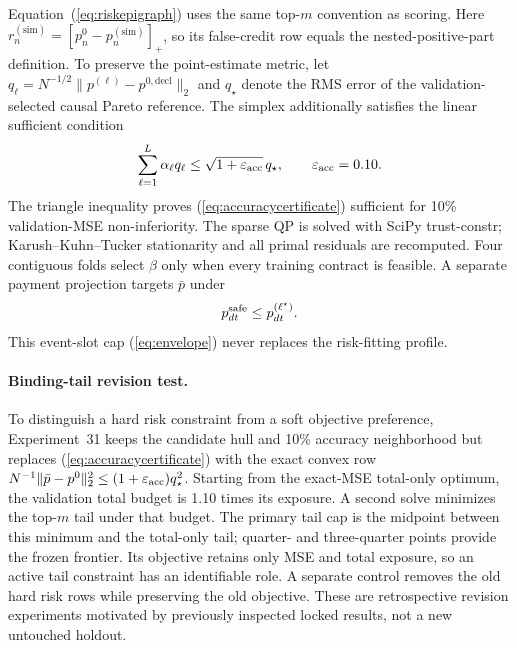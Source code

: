 \documentclass[10pt,journal]{IEEEtran}
\begin{document}
Equation~(\ref{eq:riskepigraph}) uses the same top-$m$ convention as scoring.
Here $r^{(\mathrm{sim})}_n=[p^0_n-p^{(\mathrm{sim})}_n]_+$, so its false-credit
row equals the nested-positive-part definition. To preserve the point-estimate metric, let
$q_\ell=N^{-1/2}\|p^{(\ell)}-p^{0,\mathrm{decl}}\|_2$ and
$q_\star$ denote the RMS error of the validation-selected causal Pareto
reference. The simplex additionally satisfies the linear sufficient condition
\begin{equation}
 \sum_{\ell=1}^{L}\alpha_\ell q_\ell
 \leq \sqrt{1+\varepsilon_{\rm acc}}\,q_\star,\qquad
 \varepsilon_{\rm acc}=0.10 .
 \label{eq:accuracycertificate}
\end{equation}
The triangle inequality proves (\ref{eq:accuracycertificate}) sufficient for
10\% validation-MSE non-inferiority. The sparse QP is solved with SciPy
trust-constr; Karush--Kuhn--Tucker stationarity and all primal residuals are
recomputed. Four contiguous folds select $\beta$ only when every training
contract is feasible. A separate payment projection targets $\bar p$ under
\begin{equation}
p^{\rm safe}_{dt}\leq p^{(\ell^\star)}_{dt}. \label{eq:envelope}
\end{equation}
This event-slot cap (\ref{eq:envelope}) never replaces the risk-fitting profile.

\paragraph{Binding-tail revision test.}
To distinguish a hard risk constraint from a soft objective preference,
Experiment~31 keeps the candidate hull and 10\% accuracy neighborhood but
replaces (\ref{eq:accuracycertificate}) with the exact convex row
$N^{-1}\|\bar p-p^0\|_2^2\leq(1+\varepsilon_{\rm acc})q_\star^2$. Starting from the exact-MSE total-only optimum, the
validation total budget is 1.10 times its exposure. A second solve minimizes
the top-$m$ tail under that budget. The primary tail cap is the midpoint
between this minimum and the total-only tail; quarter- and three-quarter
points provide the frozen frontier. Its objective retains only MSE and total
exposure, so an active tail constraint has an identifiable role. A separate
control removes the old hard risk rows while preserving the old objective.
These are retrospective revision experiments motivated by previously inspected
locked results, not a new untouched holdout.
\end{document}
